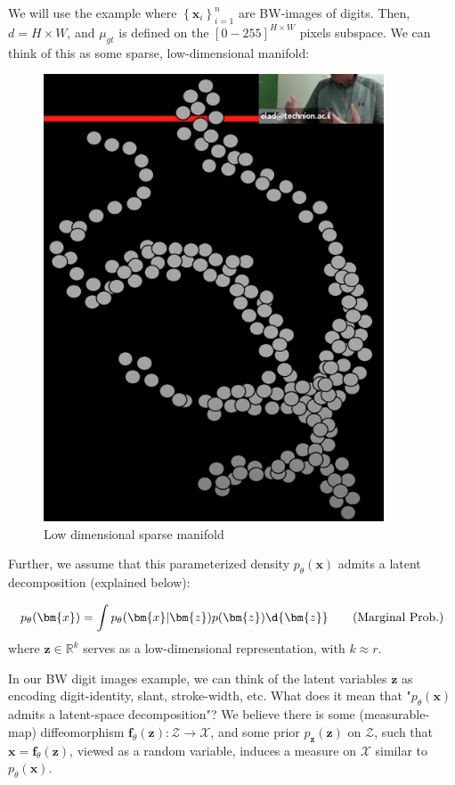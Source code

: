 \documentclass{article}
\begin{document}
We will use the example where $\left\{ \bm{x}_i \right\}_{i=1}^{n}$ are BW-images of digits. Then,  $d = H \times  W$, and $\mu_{gt}$ is defined on the $[0-255]^{H \times  W}$ pixels subspace. 
We can think of this as some sparse, low-dimensional manifold:
\begin{figure}[H] \centering \includegraphics[height=0.2\textheight,width=0.9\textwidth,keepaspectratio]{lowDimensionalManifold} \caption{Low dimensional sparse manifold} \label{fig:lowDimensionalManifold} \end{figure}


  Further, we assume that this parameterized density $p_{\theta}(\bm{x})$ admits a latent decomposition (explained below):

\begin{equation} \label{eq:marginalLikelihood2}
  p_{\theta}(\bm{x}) = \int p_{\theta}(\bm{x} | \bm{z}) p(\bm{z}) \d{\bm{z}} \tag{Marginal Prob.}
\end{equation}
where $\bm{z} \in \mathbb{R}^{k}$ serves as a low-dimensional representation, with $k \approx r$.

In our BW digit images example, we can think of the latent variables $\bm{z}$ as encoding digit-identity, slant, stroke-width, etc. What does it mean that "$p_{\theta}(\bm{x})$ admits a latent-space decomposition"? 
We believe there is some (measurable-map) diffeomorphism $\bm{f}_{\theta}(\bm{z}) : \mathcal{Z} \to \mathcal{X}$, and some prior $p_{\bm{z}}(\bm{z})$ on $\mathcal{Z}$, such that $\bm{x} = \bm{f}_{\theta}(\bm{z})$, viewed as a random variable, induces a measure on $\mathcal{X}$ similar to $p_{\theta}(\bm{x})$. 
\end{document}
